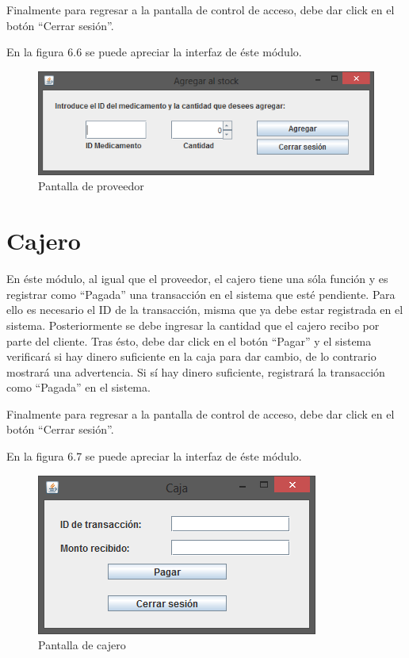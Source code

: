 Finalmente para regresar a la pantalla de control de acceso, debe dar click en el bot\'on "`Cerrar sesi\'on"'.

En la figura 6.6 se puede apreciar la interfaz de \'este m\'odulo.


\begin{figure}[htbp!]
		\centering		
	\end{figure}
	
\begin{figure}[htbp!]
\centering
		\includegraphics[width=.7\textwidth]{images/gui/IUProv}
		\caption{Pantalla de proveedor}
\end{figure}

\section{Cajero}
En \'este m\'odulo, al igual que el proveedor, el cajero tiene una s\'ola funci\'on y es registrar como "`Pagada"' una transacci\'on en el sistema que est\'e pendiente. Para ello es necesario el ID de la transacci\'on, misma que ya debe estar registrada en el sistema. Posteriormente se debe ingresar la cantidad que el cajero recibo por parte del cliente. Tras \'esto, debe dar click en el bot\'on "`Pagar"' y el sistema verificar\'a si hay dinero suficiente en la caja para dar cambio, de lo contrario mostrar\'a una advertencia. Si s\'i hay dinero suficiente, registrar\'a la transacci\'on como "`Pagada"' en el sistema.


Finalmente para regresar a la pantalla de control de acceso, debe dar click en el bot\'on "`Cerrar sesi\'on"'.

En la figura 6.7 se puede apreciar la interfaz de \'este m\'odulo.

\begin{figure}[htbp!]
		\centering		
	\end{figure}
\begin{figure}[htbp!]
\centering
		\includegraphics[width=.5\textwidth]{images/gui/IUCaja}
		\caption{Pantalla de cajero}
\end{figure}


